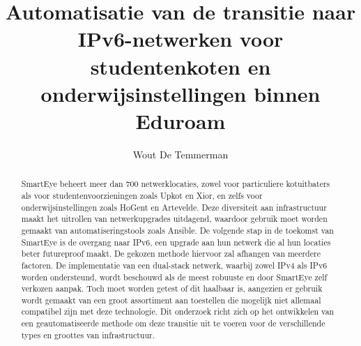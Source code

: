 \documentclass{hogent-article}
\title{Automatisatie van de transitie naar IPv6-netwerken voor studentenkoten en onderwijsinstellingen binnen Eduroam}
\author{Wout De Temmerman}
\begin{document}
\begin{abstract}
  SmartEye beheert meer dan 700 netwerklocaties, zowel voor particuliere kotuitbaters als voor studentenvoorzieningen zoals Upkot en Xior, en zelfs voor onderwijsinstellingen zoals HoGent en Artevelde.
  Deze diversiteit aan infrastructuur maakt het uitrollen van netwerkupgrades uitdagend, waardoor gebruik moet worden gemaakt van automatiseringstools zoals Ansible.
  De volgende stap in de toekomst van SmartEye is de overgang naar IPv6, een upgrade aan hun netwerk die al hun locaties beter futureproof maakt.
  De gekozen methode hiervoor zal afhangen van meerdere factoren. De implementatie van een dual-stack netwerk, waarbij zowel IPv4 als IPv6 worden ondersteund, wordt beschouwd als de meest robuuste en door SmartEye zelf verkozen aanpak.
  Toch moet worden getest of dit haalbaar is, aangezien er gebruik wordt gemaakt van een groot assortiment aan toestellen die mogelijk niet allemaal compatibel zijn met deze technologie.
  Dit onderzoek richt zich op het ontwikkelen van een geautomatiseerde methode om deze transitie uit te voeren voor de verschillende types en groottes van infrastructuur.
\end{abstract}

\tableofcontents



\printbibliography[heading=bibintoc]
\end{document}
